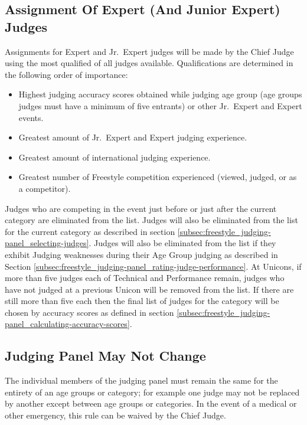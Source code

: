 \subsection{Assignment Of Expert (And Junior Expert) Judges \label{subsec:freestyle_judging-panel_assignment-of-expert-judges}} %
Assignments for Expert and Jr.~Expert judges will be made by the Chief Judge using the most qualified of all judges available.
Qualifications are determined in the following order of importance: 
\begin{itemize}
\item Highest judging accuracy scores obtained while judging age group (age groups judges must have a minimum of five entrants) or other Jr.~Expert and Expert events.
\item Greatest amount of Jr.~Expert and Expert judging experience.
\item Greatest amount of international judging experience.
\item Greatest number of Freestyle competition experienced (viewed, judged, or as a competitor).
\end{itemize}
Judges who are competing in the event just before or just after the current category are eliminated from the list.
Judges will also be eliminated from the list for the current category as described in section \ref{subsec:freestyle_judging-panel_selecting-judges}.
Judges will also be eliminated from the list if they exhibit Judging weaknesses during their Age Group judging as described in Section \ref{subsec:freestyle_judging-panel_rating-judge-performance}.
At Unicons, if more than five judges each of Technical and Performance remain, judges who have not judged at a previous Unicon will be removed from the list.
If there are still more than five each then the final list of judges for the category will be chosen by accuracy scores as defined in section \ref{subsec:freestyle_judging-panel_calculating-accuracy-scores}.

\subsection{Judging Panel May Not Change}
The individual members of the judging panel must remain the same for the entirety of an age groups or category; for example one judge may not be replaced by another except between age groups or categories.
In the event of a medical or other emergency, this rule can be waived by the Chief Judge.

